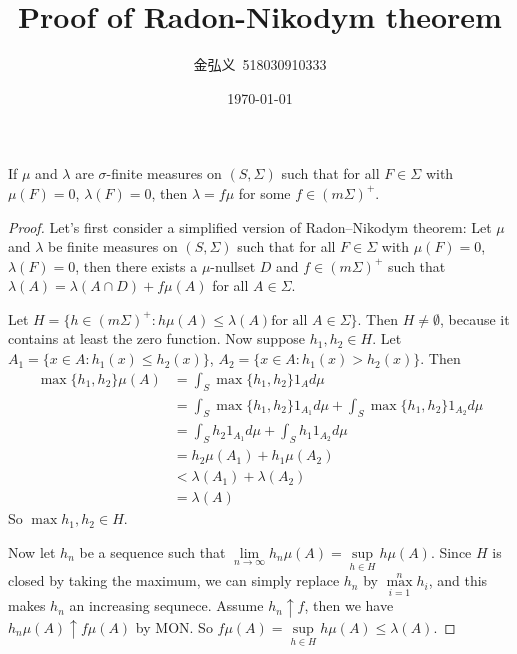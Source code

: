 \documentclass[a4paper, linespread=1.5]{article}
\begin{document}
    \title{ Proof of Radon-Nikodym theorem}
    \author{金弘义\ 518030910333}
    \date{\today}
    \maketitle
    \begin{customthm}{}
        If $\mu$ and $\lambda$ are $\sigma$-finite measures on $(S,\Sigma)$ such that for all $F\in\Sigma$ with $\mu(F)=0$, $\lambda(F)=0$, then $\lambda=f\mu$ for some $f\in(m\Sigma)^{+}$.
    \end{customthm}
    \begin{proof}
        Let's first consider a simplified version of Radon–Nikodym theorem:
        Let $\mu$ and $\lambda$ be finite measures on $(S,\Sigma)$ such that for all $F\in\Sigma$ with $\mu(F)=0$, $\lambda(F)=0$, then there exists a $\mu$-nullset $D$ and $f\in(m\Sigma)^{+}$ such that $\lambda(A)=\lambda(A\cap D)+f\mu(A)$ for all $A\in\Sigma$.

        Let $H=\{h\in(m\Sigma)^{+}:h\mu(A)\le\lambda(A)\text{for all }A\in\Sigma \}$.
        Then $H\ne \emptyset$, because it contains at least the zero function.
        Now suppose $h_1,h_2\in H$.
        Let $A_1=\{x\in A:h_1(x)\le h_2(x)\}$, $A_2=\{x\in A:h_1(x)> h_2(x)\}$.
        Then
        \begin{align*}
            \max \{h_1,h_2\}\mu(A)&=\int_{S}\max \{h_1,h_2\}1_{A}d\mu\\
                                    &=\int_{S}\max \{h_1,h_2\}1_{A_1}d\mu+\int_{S}\max \{h_1,h_2\}1_{A_2}d\mu \\
                                    &=\int_{S}h_{2}1_{A_1}d\mu+\int_{S}h_{1}1_{A_2}d\mu \\
                                    &=h_{2}\mu(A_{1})+h_{1}\mu(A_{2}) \\
                                    &<\lambda(A_{1})+\lambda(A_{2}) \\
                                    &=\lambda(A)
        \end{align*}
        So $\max{h_1,h_2}\in H$.

        Now let $h_n$ be a sequence such that $\lim\limits_{n\to\infty}h_n\mu(A)=\sup\limits_{h\in H} h\mu(A)$.
        Since $H$ is closed by taking the maximum, we can simply replace $h_n$ by $\max\limits_{i=1}^{n}h_i$, and this makes $h_n$ an increasing sequnece.
        Assume $h_n\uparrow f$, then we have $h_n\mu(A)\uparrow f\mu(A)$ by MON.
        So $f\mu(A)=\sup\limits_{h\in H} h\mu(A)\le \lambda(A)$.


\end{proof}
\end{document}

